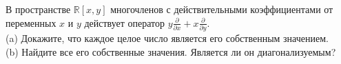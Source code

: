 \documentclass{article}
\begin{document}
В пространстве $\mathbb{R} [x,y]$ многочленов с действительными коэффициентами от переменных
$x$ и $y$ действует оператор $y \frac{\partial}{\partial x} + x \frac{\partial}{\partial y}$.\\
(a)  Докажите, что каждое целое число является его собственным значением.\\
(b)  Найдите все его собственные значения. Является ли он диагонализуемым?
\end{document}
